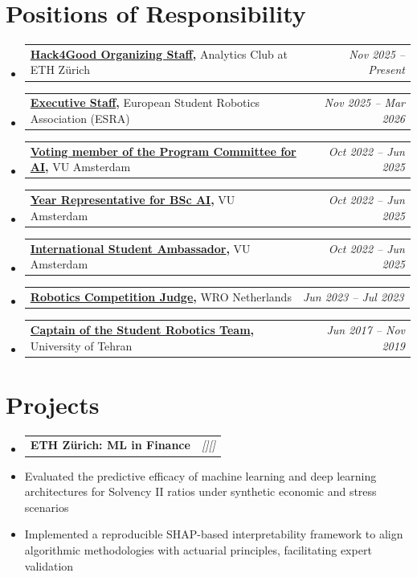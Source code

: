 \documentclass[a4paper,11pt]{article}
\makeatletter
\newcommand{\resumePOR}[3]{
\vspace{0.5mm}\item
    \begin{tabular*}{0.97\textwidth}[t]{l@{\extracolsep{\fill}}r}
        \textbf{#1}\hspace{0.3mm}#2 & \textit{\small{#3}} 
    \end{tabular*}
    \vspace{-2mm}
}
\newcommand{\resumeProject}[4]{
\vspace{0.5mm}\item
    \begin{tabular*}{0.98\textwidth}[t]{l@{\extracolsep{\fill}}r}
        \textbf{#1}\hspace{0.5em}#4 & \textit{\footnotesize{#3}} \\
    \end{tabular*}
    \vspace{-2.4mm}
}
\newcommand{\resumeSubHeadingListStart}{\begin{itemize}[leftmargin=*,labelsep=1mm]}
\newcommand{\resumeItemListStart}{\begin{itemize}[leftmargin=*,labelsep=1mm,itemsep=0.5mm]}
\newcommand{\resumeSubHeadingListEnd}{\end{itemize}\vspace{2mm}}
\newcommand{\resumeItemListEnd}{\end{itemize}\vspace{-2mm}}
\makeatother
\begin{document}
\section{\textbf{Positions of Responsibility}}
\vspace{-0.4mm}
\resumeSubHeadingListStart
    
    \resumePOR{\href{https://www.analytics-club.org/hack4good}{Hack4Good Organizing Staff}, } %
    {Analytics Club at ETH Zürich} %
    {Nov 2025 – Present}
    \resumePOR{\href{https://www.studentrobotics.eu/}{Executive Staff}, } %
    {European Student Robotics Association (ESRA)} %
    {Nov 2025 – Mar 2026}
    \resumePOR{\href{https://vu.nl/en/student/participation-in-decision-making/programme-committees}{Voting member of the Program Committee for AI}, } %
    {VU Amsterdam} %
    {Oct 2022 – Jun 2025} %
    \resumePOR{\href{https://vu.nl/en/education/bachelor/artificial-intelligence}{Year Representative for BSc AI}, } %
    {VU Amsterdam} %
    {Oct 2022 – Jun 2025} %
    \resumePOR{\href{https://www.linkedin.com/in/mahbodtajdini/details/experience/1707225648347/single-media-viewer/?profileId=ACoAADRMwb4Byod_U7xDS_8TfVrdUDd9eVLqE5k}{International Student Ambassador}, } %
    {VU Amsterdam} %
    {Oct 2022 – Jun 2025} %
    \resumePOR{\href{https://wro-association.org/}{Robotics Competition Judge}, } %
    {WRO Netherlands} %
    {Jun 2023 – Jul 2023} %

\resumePOR{\href{https://me.ut.ac.ir/introduction}{Captain of the Student Robotics Team}, } %
    {University of Tehran} %
    {Jun 2017 – Nov 2019} %



\resumeSubHeadingListEnd
\vspace{-5mm}








\section{\textbf{Projects}}
\vspace{-0.4mm}
\resumeSubHeadingListStart
\resumeProject
    {ETH Zürich: ML in Finance}

    {Aug 2025 – Oct 2025}
    {{[\href{https://finsuretech.ethz.ch/} {\faIcon{globe}}]}[\href{https://github.com/Ace3Z/ETH-Innovation-Project-ML-in-Finance-Insurance}{\textcolor{darkblue}{\faGithub}}]}
\resumeItemListStart
    \item Evaluated the predictive efficacy of machine learning and deep learning architectures for Solvency II ratios under synthetic economic and stress scenarios
    \item Implemented a reproducible SHAP-based interpretability framework to align algorithmic methodologies with actuarial principles, facilitating expert validation
\resumeItemListEnd
\end{document}
